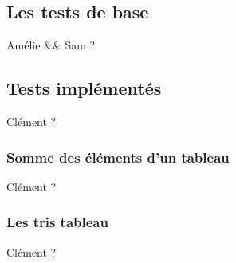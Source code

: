 \subsection{Les tests de base}
Amélie && Sam ?
\subsection{Tests implémentés}
Clément ?
\subsubsection{Somme des éléments d'un tableau}
Clément ?
\subsubsection{Les tris tableau}
Clément ?